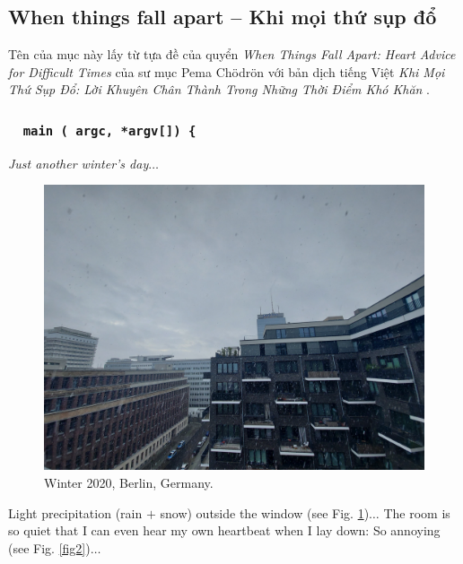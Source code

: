 \documentclass[12pt]{article}
\begin{document}
\subsection{When things fall apart -- Khi mọi thứ sụp đổ}
Tên của mục này lấy từ tựa đề của quyển {\it When Things Fall Apart: Heart Advice for Difficult Times} \cite{Chodron2002} của sư mục {\sc Pema Ch\"odr\"on} với bản dịch tiếng Việt {\it Khi Mọi Thứ Sụp Đổ: Lời Khuyên Chân Thành Trong Những Thời Điểm Khó Khăn} \cite{Chodron2021}.

\subsubsection{{\tt {\color{cyan}{\it int}} {\color{YellowGreen} main} ({\color{cyan}{\it int}} argc, {\color{cyan}{\it char}} *argv[]) \{}}

 {\it Just another winter's day}$\ldots$

\begin{figure}[H]
	\centering
	\includegraphics[width = 15cm]{Berlin_winter2020}
	\caption{Winter 2020, Berlin, Germany.}
	\label{fig1}
\end{figure}
Light precipitation (rain $+$ snow) outside the window (see Fig. \ref{fig1})$\ldots$ The room is so quiet that I can even hear my own heartbeat when I lay down: So annoying (see Fig. \ref{fig2})$\ldots$
\end{document}
